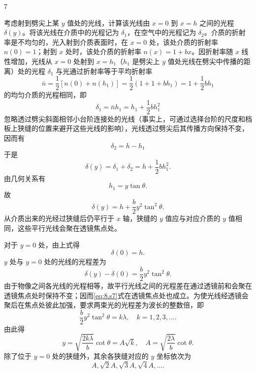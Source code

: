 \begin{solution}{7}
\begin{subsolution}
考虑射到劈尖上某 $y$ 值处的光线，计算该光线由 $x = 0$ 到 $x = h$ 之间的光程 $\delta(y)$。将该光线在介质中的光程记为 $\delta_1$，在空气中的光程记为 $\delta_2$。介质的折射率是不均匀的，光入射到介质表面时，在 $x = 0$ 处，该处介质的折射率 $n(0) = 1$；射到 $x$ 处时，该处介质的折射率 $n(x) = 1 + bx$。因折射率随 $x$ 线性增加，光线从 $x = 0$ 处射到 $x = h_1$（$h_1$ 是劈尖上 $y$ 值处光线在劈尖中传播的距离）处的光程 $\delta_1$ 与光通过折射率等于平均折射率
\begin{equation}
\bar{n} = \frac{1}{2}[n(0) + n(h_1)] = \frac{1}{2}(1 + 1 + b h_1) = 1 + \frac{1}{2} b h_1
\label{eq:1.s7}
\end{equation}
的均匀介质的光程相同，即
\begin{equation}
\delta_1 = \bar{n} h_1 = h_1 + \frac{1}{2} b h_1^2
\label{eq:2.s7}
\end{equation}
忽略透过劈尖斜面相邻小台阶连接处的光线（事实上，可通过选择台阶的尺度和档板上狭缝的位置来避开这些光线的影响），光线透过劈尖后其传播方向保持不变，因而有
\begin{equation}
\delta_2 = h - h_1
\label{eq:3.s7}
\end{equation}
于是
\begin{equation}
\delta(y) = \delta_1 + \delta_2 = h + \frac{1}{2} b h_1^2.
\label{eq:4.s7}
\end{equation}
由几何关系有
\begin{equation}
h_1 = y \tan \theta .
\label{eq:5.s7}
\end{equation}
故
\begin{equation}
\delta(y) = h + \frac{b}{2} y^2 \tan^2 \theta .
\label{eq:6.s7}
\end{equation}
从介质出来的光经过狭缝后仍平行于 $x$ 轴，狭缝的 $y$ 值应与对应介质的 $y$ 值相同，这些平行光线会聚在透镜焦点处。

对于 $y = 0$ 处，由上式得
\begin{equation}
\delta(0) = h.
\label{eq:7.s7}
\end{equation}
$y$ 处与 $y = 0$ 处的光线的光程差为
\begin{equation}
\delta(y) - \delta(0) = \frac{b}{2} y^2 \tan^2 \theta .
\label{eq:8.s7}
\end{equation}
由于物像之间各光线的光程相等，故平行光线之间的光程差在通过透镜前和会聚在透镜焦点处时保持不变；因而\eqref{eq:8.s7}式在透镜焦点处也成立。为使光线经透镜会聚后在焦点处彼此加强，要求两束光的光程差为波长的整数倍，即
\begin{equation}
\frac{b}{2} y^2 \tan^2 \theta = k \lambda, \quad k = 1, 2, 3, \dots .
\label{eq:9.s7}
\end{equation}
由此得
\begin{equation}
y = \sqrt{\frac{2k\lambda}{b}} \cot \theta = A \sqrt{k}, \quad A = \sqrt{\frac{2\lambda}{b}} \cot \theta .
\label{eq:10.s7}
\end{equation}
除了位于 $y = 0$ 处的狭缝外，其余各狭缝对应的 $y$ 坐标依次为
\begin{equation}
A, \sqrt{2}A, \sqrt{3}A, \sqrt{4}A, \dots .
\label{eq:11.s7}
\end{equation}
\end{subsolution}


\end{solution}

